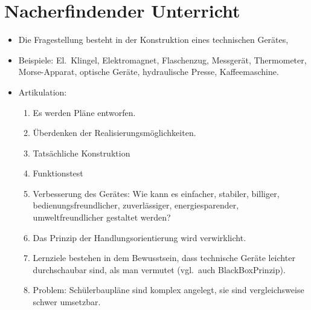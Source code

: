 \bip\bip
\section{Nacherfindender Unterricht}
\begin{itemize}
\item Die Fragestellung besteht in der Konstruktion eines
technischen Ger\"{a}tes,
\item Beispiele: El.\ Klingel, Elektromagnet, Flaschenzug,
Messger\"{a}t, Thermometer, Morse-Apparat, optische Ger\"{a}te,
hydraulische Presse, Kaffeemaschine.
\item Artikulation:
\begin{enumerate}
\item Es werden Pl\"{a}ne entworfen.
\item \"{U}berdenken der Realisierungsm\"{o}glichkeiten.
\item Tats\"{a}chliche Konstruktion
\item Funktionstest
\item Verbesserung des Ger\"{a}tes: Wie kann es einfacher, stabiler,
billiger, bedienungsfreundlicher, zuverl\"{a}ssiger, energiesparender,
umweltfreundlicher gestaltet werden?
\item Das Prinzip der Handlungsorientierung wird verwirklicht.
\item Lernziele bestehen in dem Bewusstsein, dass technische Ger\"{a}te
leichter durchschaubar sind, als man vermutet (vgl.\ auch
BlackBoxPrinzip).
\item Problem: Sch\"{u}lerbaupl\"{a}ne sind komplex angelegt, sie sind
vergleichsweise schwer umsetzbar.
\end{enumerate}
\end{itemize}


